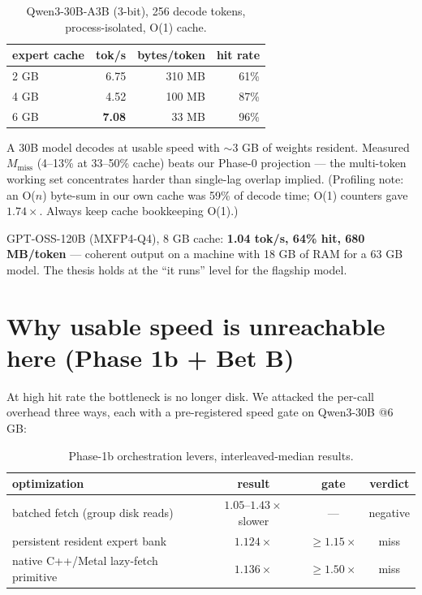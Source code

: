\documentclass[11pt]{article}
\begin{document}
\begin{table}[h]
\centering
\caption{Qwen3-30B-A3B (3-bit), 256 decode tokens, process-isolated, O(1) cache.}
\begin{tabular}{lrrr}
\toprule
expert cache & tok/s & bytes/token & hit rate \\
\midrule
2 GB & 6.75 & 310 MB & 61\% \\
4 GB & 4.52 & 100 MB & 87\% \\
6 GB & \textbf{7.08} & 33 MB & 96\% \\
\bottomrule
\end{tabular}
\end{table}

A 30B model decodes at usable speed with ${\sim}3$ GB of weights resident. Measured $M_{\text{miss}}$ (4--13\% at 33--50\% cache) beats our Phase-0 projection --- the multi-token working set concentrates harder than single-lag overlap implied. (Profiling note: an O($n$) byte-sum in our own cache was 59\% of decode time; O(1) counters gave $1.74\times$. Always keep cache bookkeeping O(1).)

GPT-OSS-120B (MXFP4-Q4), 8 GB cache: \textbf{1.04 tok/s, 64\% hit, 680 MB/token} --- coherent output on a machine with 18 GB of RAM for a 63 GB model. The thesis holds at the ``it runs'' level for the flagship model.

\section{Why usable speed is unreachable here (Phase 1b + Bet B)}
\label{sec:wall}

At high hit rate the bottleneck is no longer disk. We attacked the per-call overhead three ways, each with a pre-registered speed gate on Qwen3-30B @6 GB:

\begin{table}[h]
\centering
\caption{Phase-1b orchestration levers, interleaved-median results.}
\begin{tabular}{lccc}
\toprule
optimization & result & gate & verdict \\
\midrule
batched fetch (group disk reads) & $1.05$--$1.43\times$ slower & --- & negative \\
persistent resident expert bank & $1.124\times$ & ${\ge}1.15\times$ & miss \\
native C++/Metal lazy-fetch primitive & $1.136\times$ & ${\ge}1.50\times$ & miss \\
\bottomrule
\end{tabular}
\end{table}
\end{document}
